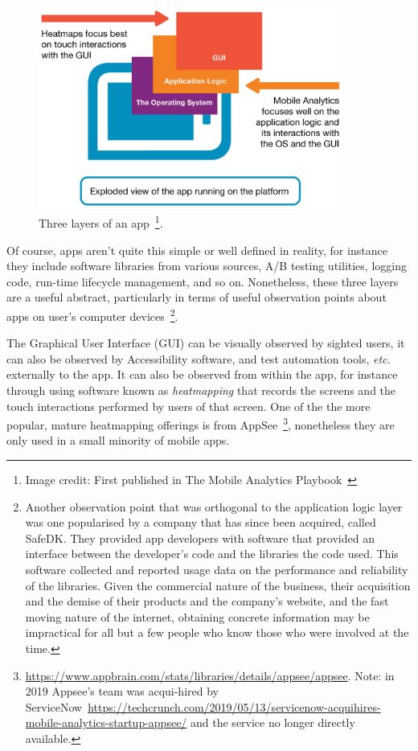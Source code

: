 \begin{figure}[htbp!]
    \begin{minipage}{\textwidth}
    \centering
    \includegraphics[width=10cm]{images/mobile-analytics-playbook/3-layers.png}
    \caption[Three layers of an app]{Three layers of an app~\footnote{Image credit: First published in The Mobile Analytics Playbook~\citep{harty_aymer_playbook_2016}}.}
    \label{fig:3-layers}
    \end{minipage}
\end{figure}

Of course, apps aren't quite this simple or well defined in reality, for instance they include software libraries from various sources, A/B testing utilities, logging code, run-time lifecycle management, and so on. Nonetheless, these three layers are a useful abstract, particularly in terms of useful observation points about apps on user's computer devices~\footnote{Another observation point that was orthogonal to the application logic layer was one popularised by a company that has since been acquired, called SafeDK. They provided app developers with software that provided an interface between the developer's code and the libraries the code used. This software collected and reported usage data on the performance and reliability of the libraries. Given the commercial nature of the business, their acquisition and the demise of their products and the company's website, and the fast moving nature of the internet, obtaining concrete information may be impractical for all but a few people who know those who were involved at the time.}.

The Graphical User Interface (GUI) %
can be visually observed by sighted users, it can also be observed by Accessibility software, and test automation tools, \emph{etc.} externally to the app. It can also be observed from within the app, for instance through using software known as \emph{heatmapping} that records the screens and the touch interactions performed by users of that screen. One of the the more popular, mature heatmapping offerings is from AppSee~\footnote{\url{  https://www.appbrain.com/stats/libraries/details/appsee/appsee}. Note: in 2019 Appsee's team was acqui-hired by ServiceNow~\url{https://techcrunch.com/2019/05/13/servicenow-acquihires-mobile-analytics-startup-appsee/} and the service no longer directly available.}, nonetheless they are only used in a small minority of mobile apps.


